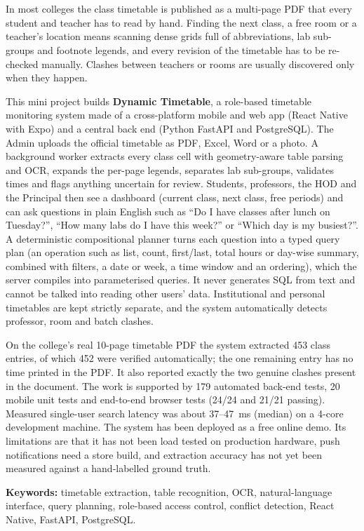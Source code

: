 \section*{}
\vspace{0.5cm}
In most colleges the class timetable is published as a multi-page PDF that every student and teacher
has to read by hand. Finding the next class, a free room or a teacher's location means scanning dense
grids full of abbreviations, lab sub-groups and footnote legends, and every revision of the timetable
has to be re-checked manually. Clashes between teachers or rooms are usually discovered only when they
happen.

This mini project builds \textbf{Dynamic Timetable}, a role-based timetable monitoring system made of
a cross-platform mobile and web app (React Native with Expo) and a central back end (Python FastAPI
and PostgreSQL). The Admin uploads the official timetable as PDF, Excel, Word or a photo. A
background worker extracts every class cell with geometry-aware table parsing and OCR, expands the
per-page legends, separates lab sub-groups, validates times and flags anything uncertain for review.
Students, professors, the HOD and the Principal then see a dashboard (current class, next class,
free periods) and can ask questions in plain English such as ``Do I have classes after lunch on
Tuesday?'', ``How many labs do I have this week?'' or ``Which day is my busiest?''. A deterministic
compositional planner turns each question into a typed query plan (an operation such as list, count,
first/last, total hours or day-wise summary, combined with filters, a date or week, a time window and
an ordering), which the server compiles into parameterised queries.
It never generates SQL from text and cannot be talked into reading other users' data. Institutional and personal timetables are
kept strictly separate, and the system automatically detects professor, room and batch clashes.

On the college's real 10-page timetable PDF the system extracted 453 class entries, of which 452
were verified automatically; the one remaining entry has no time printed in the PDF. It also reported
exactly the two genuine clashes present in the document. The work is supported by 179 automated
back-end tests, 20 mobile unit tests and end-to-end browser tests (24/24 and 21/21 passing).
Measured single-user search latency was about 37--47~ms (median) on a 4-core development machine.
The system has been deployed as a free online demo. Its limitations are that it has not been load
tested on production hardware, push notifications need a store build, and extraction accuracy has
not yet been measured against a hand-labelled ground truth.

\vspace{0.5cm}
\noindent\textbf{Keywords:} timetable extraction, table recognition, OCR, natural-language interface,
query planning, role-based access control, conflict detection, React Native, FastAPI,
PostgreSQL.
\newpage
